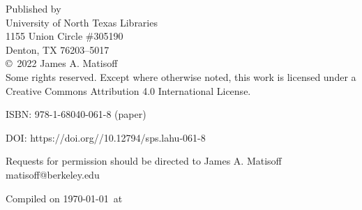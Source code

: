 \thispagestyle{empty}
\begin{center}
\vspace*{\fill}
Published by \\
University of North Texas Libraries \\
1155 Union Circle \#305190 \\
Denton, TX  76203–5017 \\
\vspace{10em}
\copyright \ 2022 James A. Matisoff \\
Some rights reserved. Except where otherwise noted, this work is licensed under a Creative Commons Attribution 4.0 International License.

ISBN: 978-1-68040-061-8 (paper)

DOI: https://doi.org//10.12794/sps.lahu-061-8


Requests for permission should be directed to James A. Matisoff matisoff@berkeley.edu

\vspace{4em}
Compiled on \today\ at \currenttime
\vspace*{\fill}
\end{center}